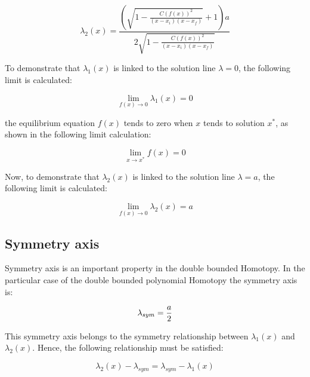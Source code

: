 \documentclass[conference,letterpaper,onecolumn]{IEEEtran}
\begin{document}
\begin{equation}
\lambda_2(x)= {\frac {\left( \sqrt {1-{\frac {C \left( f \left( x \right)  \right) ^{2
}}{ \left( x-x_i \right)  \left( x-x_f \right) }}}+1
 \right) a}{2\sqrt {1-{\frac {C \left( f \left( x \right) 
 \right) ^{2}}{ \left( x-x_i \right)  \left( x-x_f
 \right) }}}}}
\label{SB2}
\end{equation}

To demonstrate that $\lambda_1(x)$ is linked to the solution line $\lambda=0$, the following limit is calculated:

\begin{equation}
 \displaystyle\lim_{f(x) \to{0}}{\lambda_1(x)}=0 
 \label{demos1x}
\end{equation}

the equilibrium equation $f(x)$ tends to zero when $x$ tends to solution $x^*$, as shown in the following limit calculation:

\begin{equation}
 \displaystyle\lim_{x \to{x^*}}{f(x)}=0 
 \label{demos1x2}
\end{equation}

Now, to demonstrate that $\lambda_2(x)$ is linked to the solution line $\lambda=a$, the following limit is calculated:

\begin{equation}
 \displaystyle\lim_{f(x) \to{0}}{\lambda_2(x)}=a 
 \label{demos2x}
\end{equation}



\subsection{Symmetry axis}

Symmetry axis is an important property in the double bounded Homotopy. In the particular case of the double bounded polynomial Homotopy the symmetry axis is:

\begin{equation}
\lambda_{sym}= {a \over 2}
\label{sym}
\end{equation}

This symmetry axis belongs to the symmetry relationship between $\lambda_1(x)$ and $\lambda_2(x)$.
Hence, the following relationship must be satisfied:

\begin{displaymath}
\lambda_2(x)-\lambda_{sym}=\lambda_{sym} -\lambda_1(x)
\end{displaymath}
\end{document}

